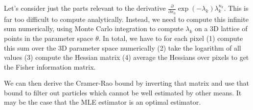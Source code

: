\documentclass{article}
\begin{document}
Let's consider just the parts relevant to the derivative $\frac{\partial}{\partial x_{0}}\exp\left(-\lambda_{k}\right)\lambda_{k}^{n_{k}}$. This is far too difficult to compute analytically. Instead, we need to compute this infinite sum numerically, using Monte Carlo integration to compute $\lambda_{k}$ on a 3D lattice of points in the parameter space $\theta$. In total, we have to for each pixel (1) compute this sum over the 3D parameter space numerically (2) take the logarithm of all values (3) compute the Hessian matrix (4) average the Hessians over pixels to get the Fisher information matrix. 

\vspace{0.2in}
We can then derive the Cramer-Rao bound by inverting that matrix and use that bound to filter out particles which cannot be well estimated by other means. It may be the case that the MLE estimator is an optimal estimator.
\end{document}
